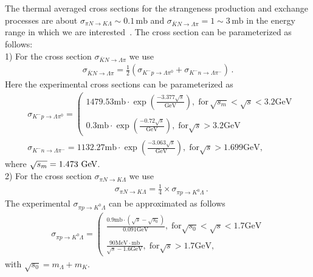 The thermal averaged cross sections for the strangeness production and exchange processes are about $\sigma_{\pi N\rightarrow K\Lambda}\sim0.1\,\mathrm{mb}$ and $\sigma_{\overline{K}N\rightarrow \Lambda\pi}=1\sim3\,\mathrm{mb}$ in the energy range in which we are interested~\cite{Koch:1986ud}. The cross section can be parameterized as follows:\\
1) For the cross section $\sigma_{\overline{K}N\rightarrow \Lambda\pi}$ we use~\cite{Koch:1986ud}
 \begin{align}
 \sigma_{\overline{K}N\rightarrow \Lambda\pi}=\frac{1}{2}\left(\sigma_{K^-p\rightarrow \Lambda\pi^0}+\sigma_{K^-n\rightarrow \Lambda\pi^-}\right)\,.
\end{align}
Here the experimental cross sections can be parameterized as 
\begin{align}
&\sigma_{K^-p\rightarrow \Lambda\pi^0}\!\!=\!\!\left(\begin{array}{l}\!\!1479.53\mathrm{mb}\!\cdot\!\exp{\left(\frac{-3.377\sqrt{s}}{\mathrm{GeV}}\right)},\; \mathrm{for}\,\sqrt{s_m}\!\!<\!\!\sqrt{s}\!<\!3.2\mathrm{GeV} \\ \\0.3\mathrm{mb}\!\cdot\!\exp{\left(\frac{-0.72\sqrt{s}}{\mathrm{GeV}}\right)},\; \mathrm{for}\sqrt{s}>3.2\mathrm{GeV}\end{array}\right.\\
&\sigma_{K^-n\rightarrow \Lambda\pi^-}\!\!=\!\!1132.27\mathrm{mb}\!\cdot\!\exp{\left(\frac{-3.063\sqrt{s}}{\mathrm{GeV}}\right)},\; \mathrm{for}\sqrt{s}>1.699\mathrm{GeV},
\end{align}
where $\sqrt{s_m}=1.473\text{ GeV}$.\\
2) For the cross section $\sigma_{\pi N\rightarrow K\Lambda}$ we use~\cite{Cugnon:1984pm}
\begin{align}
&\sigma_{\pi N\rightarrow K\Lambda}=\frac{1}{4}\times\sigma_{\pi p\rightarrow K^0\Lambda}\,.
\end{align}
The experimental $\sigma_{\pi p\rightarrow K^0\Lambda}$ can be approximated as follows
\begin{align}
\sigma_{\pi p\rightarrow K^0\Lambda}=\left(\begin{array}{l}\frac{0.9\mathrm{mb}\cdot\left(\sqrt{s}-\sqrt{s_0}\right)}{0.091\mathrm{GeV}},\; \mathrm{for} \sqrt{s_0}<\sqrt{s}<1.7\mathrm{GeV} \\ \\ \frac{90\mathrm{MeV\cdot mb}}{\sqrt{s}-1.6\mathrm{GeV}},\; \mathrm{for}\sqrt{s}>1.7\mathrm{GeV},\end{array}\right.
 \end{align}
 with $ \sqrt{s_0}=m_\Lambda+m_K$. 

